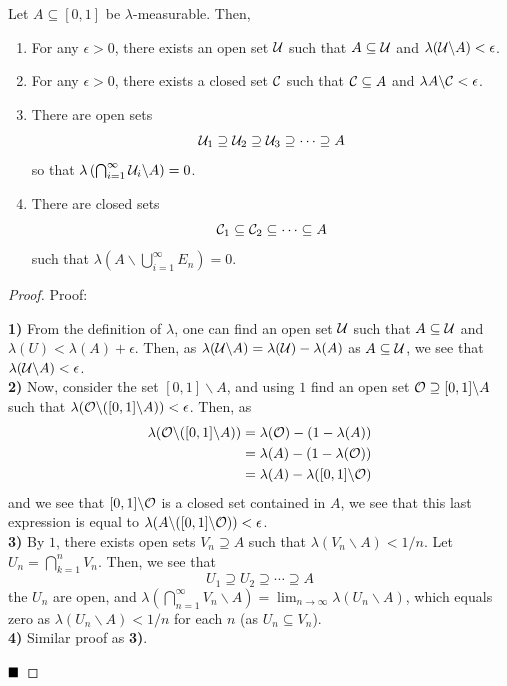 \begin{lemma}
    Let $A \subseteq [0, 1]$ be $\lambda$-measurable. Then,
    \begin{enumerate}
        \item For any $\epsilon > 0$, there exists an open set $\cal{U}$ such that $A \subseteq \cal{U}$ and $\lambda(\cal{U} \backslash A) < \epsilon$.
        \item For any $\epsilon > 0$, there exists a closed set $\cal{C}$ such that $\cal{C} \subseteq A$ and $\lambda{A \backslash \cal{C}} < \epsilon$. 
        \item There are open sets
        \[ \cal{U}_1 \supseteq \cal{U}_2 \supseteq \cal{U}_3 \supseteq \cdots \supseteq A \]
        so that $\lambda\left(\bigcap_{i = 1}^{\infty} \cal{U}_i \backslash A\right) = 0$. 
        \item There are closed sets
        \[ \cal{C}_1 \subseteq \cal{C}_2 \subseteq \cdots \subseteq A \]
        such that $\lambda\left(A \backslash \bigcup_{i = 1}^{\infty} E_{n}\right) = 0$. 
    \end{enumerate}
\end{lemma}
\begin{proof}{Proof:}
    
    \textbf{1)} From the definition of $\lambda$, one can find an open set $\cal{U}$ such that $A \subseteq \cal{U}$ and $\lambda(U) < \lambda(A) + \epsilon$. Then, as $\lambda(\cal{U} \backslash A) = \lambda(\cal{U}) - \lambda(A)$ as $A \subseteq \cal{U}$, we see that $\lambda(\cal{U} \backslash A) < \epsilon$.\\

    \textbf{2)} Now, consider the set $[0, 1] \backslash A$, and using $1$ find an open set $\cal{O} \supseteq [0, 1] \backslash A$ such that $\lambda(\cal{O} \backslash ([0, 1] \backslash A)) < \epsilon$. Then, as 
    \begin{align*}
        \lambda(\cal{O} \backslash ([0, 1] \backslash A)) &= \lambda(\cal{O}) - \left(1 - \lambda(A)\right)\\
        &= \lambda(A) - (1 - \lambda(\cal{O})) \\
        &= \lambda(A) - \lambda([0, 1] \backslash \cal{O})
    \end{align*}
    and we see that $[0, 1] \backslash \cal{O}$ is a closed set contained in $A$, we see that this last expression is equal to $\lambda(A \backslash ([0, 1] \backslash \cal{O})) < \epsilon$.\\

    \textbf{3)} By $1$, there exists open sets $V_n \supseteq A$ such that $\lambda(V_n \backslash A) < 1/n$. Let $U_n = \bigcap_{k = 1}^{n} V_n$. Then, we see that
    \[ U_1 \supseteq U_2 \supseteq \cdots \supseteq A \]
    the $U_n$ are open, and $\lambda\left(\bigcap_{n = 1}^{\infty} V_n \backslash A\right) = \lim_{n \to \infty} \lambda(U_n \backslash A)$, which equals zero as $\lambda(U_n \backslash A) < 1/n$ for each $n$ (as $U_n \subseteq V_n$).\\

    \textbf{4)} Similar proof as \textbf{3)}. 

    $\qed$
\end{proof}

